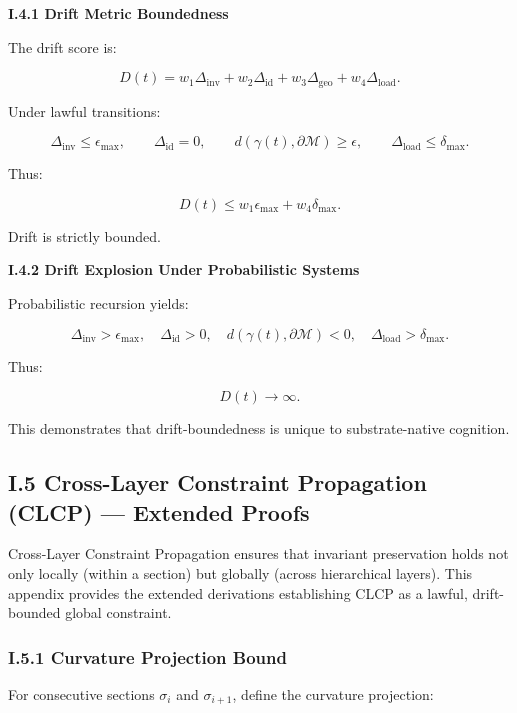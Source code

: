 \textbf{I.4.1 Drift Metric Boundedness}

The drift score is:


\[
D(t) = w_1 \Delta_{\text{inv}}
      + w_2 \Delta_{\text{id}}
      + w_3 \Delta_{\text{geo}}
      + w_4 \Delta_{\text{load}}.
\]



Under lawful transitions:


\[
\Delta_{\text{inv}} \le \epsilon_{\max},
\qquad
\Delta_{\text{id}} = 0,
\qquad
d(\gamma(t), \partial\mathcal{M}) \ge \epsilon,
\qquad
\Delta_{\text{load}} \le \delta_{\max}.
\]



Thus:


\[
D(t) \le w_1 \epsilon_{\max} + w_4 \delta_{\max}.
\]



Drift is strictly bounded.

\textbf{I.4.2 Drift Explosion Under Probabilistic Systems}

Probabilistic recursion yields:


\[
\Delta_{\text{inv}} > \epsilon_{\max}, \quad
\Delta_{\text{id}} > 0, \quad
d(\gamma(t), \partial\mathcal{M}) < 0, \quad
\Delta_{\text{load}} > \delta_{\max}.
\]



Thus:


\[
D(t) \rightarrow \infty.
\]



This demonstrates that drift-boundedness is unique to substrate-native cognition.

\subsection*{I.5 Cross-Layer Constraint Propagation (CLCP) — Extended Proofs}

Cross-Layer Constraint Propagation ensures that invariant preservation holds
not only locally (within a section) but globally (across hierarchical layers).
This appendix provides the extended derivations establishing CLCP as a lawful,
drift-bounded global constraint.

\subsubsection*{I.5.1 Curvature Projection Bound}

For consecutive sections $\sigma_i$ and $\sigma_{i+1}$, define the curvature
projection:



